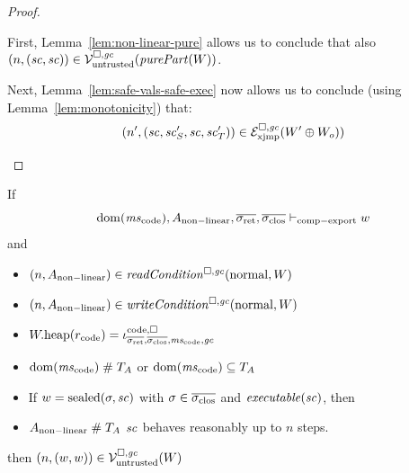 \documentclass[a4paper]{article}
\begin{document}
\begin{proof}
\begin{itemize}
\begin{itemize}
     First, Lemma~\ref{lem:non-linear-pure} allows us to conclude that also $\npair{(\vsc,\vsc)} \in \lrv (\purePart{W})$.

     Next, Lemma~\ref{lem:safe-vals-safe-exec} now allows us to conclude (using Lemma~\ref{lem:monotonicity}) that:
     \begin{equation*}
       \npair[n']{(\vsc,\vsc_S',\vsc,\vsc_T')} \in \lrexj(W'\oplus W_o))
     \end{equation*}
    \end{itemize}
  \end{itemize}
\end{proof}

\begin{lemma}
  \label{lem:ftlr-comp-export}
  If
  \begin{equation*}
    \dom(\mscode), A_{\mathrm{non-linear}}, \sigrets,\sigcloss \vdash_{\mathrm{comp-export}} w
  \end{equation*}
  and
  \begin{itemize}
  \item $\npair{A_{\mathrm{non-linear}}} \in \readCond{\normal,W}$
  \item $\npair{A_{\mathrm{non-linear}}} \in \writeCond{\normal,W}$
  \item $\pwheap(r_{\mathrm{code}}) = \codereg{\sigrets,\sigcloss,\mscode,\gc}$
  \item $\dom(\mscode) \mathrel{\#} \ta$ or $\dom(\mscode) \subseteq \ta$
  \item If $w = \sealed{\sigma,\vsc}$ with $\sigma \in \sigcloss$ and $\exec{\vsc}$, then
  \item $A_{\mathrm{non-linear}}\mathrel{\#} \ta$
    $\vsc$ behaves reasonably up to $n$ steps.
  \end{itemize}

  then $\npair{(w,w)} \in \lrv(W)$
\end{lemma}
\end{document}
